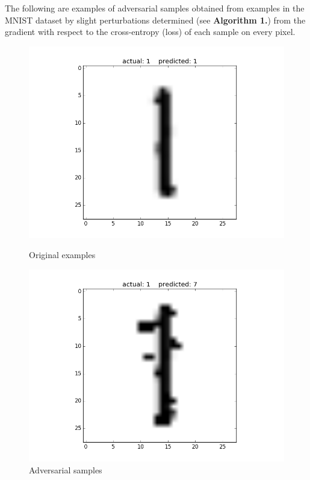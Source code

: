 \documentclass{article}
\begin{document}
The following are examples of adversarial samples obtained from examples in the MNIST dataset by slight perturbations determined (see \textbf{Algorithm 1.}) from the gradient with respect to the cross-entropy (loss) of each sample on every pixel. 
\begin{figure}[h!]
	\begin{minipage}{0.5\textwidth}
		\centering
		\includegraphics[width=\textwidth]{sample_original1.png}
		\caption{Original examples}
	\end{minipage} \hfill
	\begin{minipage}{0.5\textwidth}
		\centering
		\includegraphics[width=\textwidth]{sample_perturbed1.png}
		\caption{Adversarial samples}
	\end{minipage} 
\end{figure}
\end{document}

